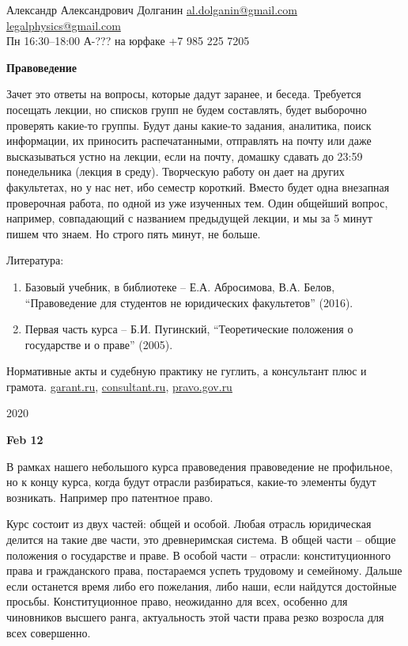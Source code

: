 \documentclass[a4paper, 12pt]{article}
\def\datee#1{\hfill\textbf{#1} \par}
\def\mailto#1{\href{mailto:#1}{#1}}
\begin{document}
\thispagestyle{empty}
\noindent
Александр Александрович Долганин
\hfill 
\mailto{al.dolganin@gmail.com}
\\ \null \hfill 
\mailto{legalphysics@gmail.com}
\\ 
Пн 16:30--18:00 А-??? на юрфаке
\hfill
+7 985 225 7205

\vfill

\begin{center}
\Large\bf
Правоведение
\end{center}

Зачет это ответы на вопросы, которые дадут заранее, и беседа. Требуется посещать лекции, но списков групп не будем составлять, будет выборочно проверять какие-то группы. Будут даны какие-то задания, аналитика, поиск информации, их приносить распечатанными, отправлять на почту или даже высказываться устно на лекции, если на почту, домашку сдавать до 23:59 понедельника (лекция в среду). Творческую работу он дает на других факультетах, но у нас нет, ибо семестр короткий. Вместо будет одна внезапная проверочная работа, по одной из уже изученных тем. Один общейший вопрос, например, совпадающий с названием предыдущей лекции, и мы за 5 минут пишем что знаем. Но строго пять минут, не больше. 

Литература: 
\begin{enumerate}
\item Базовый учебник, в библиотеке -- Е.А. Абросимова, В.А. Белов, ``Правоведение для студентов не юридических факультетов'' (2016).
\item Первая часть курса -- Б.И. Пугинский, ``Теоретические положения о государстве и о праве'' (2005).
\end{enumerate}

Нормативные акты и судебную практику не гуглить, а консультант плюс и грамота. \href{http://garant.ru}{garant.ru}, \href{http://consultant.ru}{consultant.ru}, \href{http://pravo.gov.ru}{pravo.gov.ru}

\vfill

\begin{center}
2020
\end{center}

\clearpage
\tableofcontents
\clearpage

\datee{Feb 12}
В рамках нашего небольшого курса правоведения правоведение не профильное, но к концу курса, когда будут отрасли разбираться, какие-то элементы будут возникать. Например про патентное право. 

Курс состоит из двух частей: общей и особой. Любая отрасль юридическая делится на такие две части, это древнеримская система. В общей части -- общие положения о государстве и праве. В особой части -- отрасли: конституционного права и гражданского права, постараемся успеть трудовому и семейному. Дальше если останется время либо его пожелания, либо наши, если найдутся достойные просьбы. Конституционное право, неожиданно для всех, особенно для чиновников высшего ранга, актуальность этой части права резко возросла для всех совершенно. 
\end{document}
